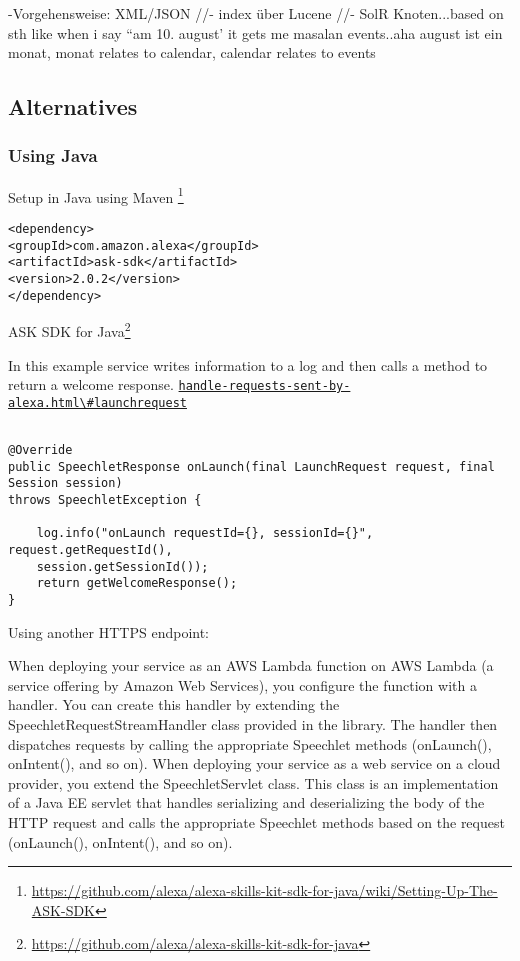 -Vorgehensweise: XML/JSON //- index über Lucene //- SolR Knoten...based on sth like when i say  ``am 10. august'  it gets me masalan events..aha august ist ein monat, monat relates to calendar, calendar relates to events





\subsection*{Alternatives}


\subsubsection*{Using Java}
Setup in Java using Maven \footnote{\url{https://github.com/alexa/alexa-skills-kit-sdk-for-java/wiki/Setting-Up-The-ASK-SDK}}

\begin{verbatim}
<dependency>
<groupId>com.amazon.alexa</groupId>
<artifactId>ask-sdk</artifactId>
<version>2.0.2</version>
</dependency>
\end{verbatim}

ASK SDK for Java\footnote{\url{https://github.com/alexa/alexa-skills-kit-sdk-for-java}}



In this example service writes information to a log and then calls a method to return a welcome response.
\href{https://developer.amazon.com/docs/custom-skills/handle-requests-sent-by-alexa.html\#launchrequest}{\lstinline|handle-requests-sent-by-alexa.html\#launchrequest|}
\begin{verbatim}

@Override
public SpeechletResponse onLaunch(final LaunchRequest request, final Session session)
throws SpeechletException {
	
	log.info("onLaunch requestId={}, sessionId={}", request.getRequestId(),
	session.getSessionId());
	return getWelcomeResponse();
}
\end{verbatim}



Using another HTTPS endpoint:

When deploying your service as an AWS Lambda function on AWS Lambda (a service offering by Amazon Web Services), you configure the function with a handler. You can create this handler by extending the SpeechletRequestStreamHandler class provided in the library. The handler then dispatches requests by calling the appropriate Speechlet methods (onLaunch(), onIntent(), and so on).
When deploying your service as a web service on a cloud provider, you extend the SpeechletServlet class. This class is an implementation of a Java EE servlet that handles serializing and deserializing the body of the HTTP request and calls the appropriate Speechlet methods based on the request (onLaunch(), onIntent(), and so on).




